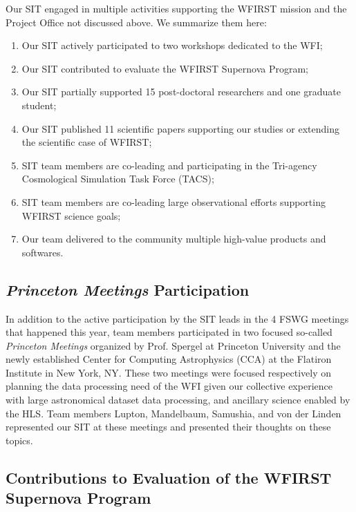 

\begin{summary}
Our SIT engaged in multiple activities supporting the WFIRST mission and the Project Office not discussed above. We summarize them here:
\begin{enumerate}
\item Our SIT actively participated to two workshops dedicated to the WFI;
\item Our SIT contributed to evaluate the WFIRST Supernova Program;
\item Our SIT partially supported 15 post-doctoral researchers and one graduate student;
\item Our SIT published 11 scientific papers supporting our studies or extending the scientific case of WFIRST;
\item SIT team members are co-leading and participating in the Tri-agency Cosmological Simulation Task Force (TACS);
\item SIT team members are co-leading large observational efforts supporting WFIRST science goals;
\item Our team delivered to the community multiple high-value products and softwares.
\end{enumerate}
\end{summary}


\subsection{\emph{Princeton Meetings} Participation}

In addition to the active participation by the SIT leads in the 4 FSWG meetings that happened this year, team members participated in two focused so-called \emph{Princeton Meetings} organized by Prof. Spergel at Princeton University and  the newly established Center for Computing Astrophysics (CCA) at the Flatiron Institute in  New York, NY. These two meetings were focused respectively on planning the data processing need of the WFI given our collective experience with large astronomical dataset data processing, and ancillary science enabled by the HLS. Team members Lupton, Mandelbaum, Samushia, and von der Linden represented our SIT at these meetings and presented their thoughts on these topics.

\subsection{Contributions to Evaluation of the WFIRST Supernova Program}

